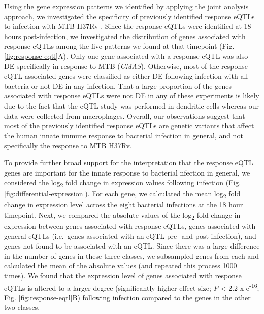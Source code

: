 Using the gene expression patterns we identified by applying the joint
analysis approach, we investigated the specificity of previously
identified response eQTLs to infection with MTB H37Rv
\citep{Barreiro2012}. Since the response eQTLs were identified at 18
hours post-infection, we investigated the distribution of genes
associated with response eQTLs among the five patterns we found at that
timepoint (Fig. \ref{fig:response-eqtl}A). Only one gene associated with a response eQTL was
also DE specifically in response to MTB (\emph{CMAS}). Otherwise, most
of the response eQTL-associated genes were classified as either DE
following infection with all bacteria or not DE in any infection. That a
large proportion of the genes associated with response eQTLs were not DE
in any of these experiments is likely due to the fact that the eQTL
study was performed in dendritic cells whereas our data were collected
from macrophages. Overall, our observations suggest that most of the
previously identified response eQTLs are genetic variants that affect
the human innate immune response to bacterial infection in general, and
not specifically the response to MTB H37Rv.

To provide further broad support for the interpretation that the
response eQTL genes are important for the innate response to bacterial
nfection in general, we considered the log\textsubscript{2} fold change
in expression values following infection (Fig. \ref{fig:differential-expression}). For each gene, we
calculated the mean log\textsubscript{2} fold change in expression level
across the eight bacterial infections at the 18 hour timepoint. Next, we
compared the absolute values of the log\textsubscript{2} fold change in
expression between genes associated with response eQTLs, genes
associated with general eQTLs (i.e.~genes associated with an eQTL pre-
and post-infection), and genes not found to be associated with an eQTL.
Since there was a large difference in the number of genes in these three
classes, we subsampled genes from each and calculated the mean of the
absolute values (and repeated this process 1000 times). We found that
the expression level of genes associated with response eQTLs is altered
to a larger degree (significantly higher effect size; \emph{P}
\textless{} 2.2 x e\textsuperscript{-16}; Fig. \ref{fig:response-eqtl}B) following infection
compared to the genes in the other two classes.

